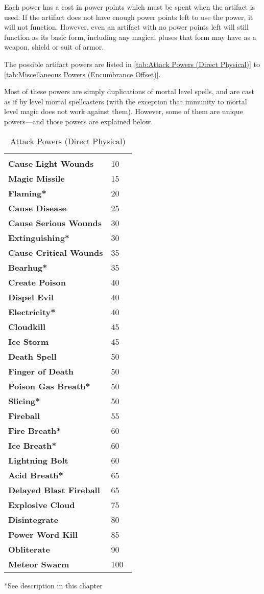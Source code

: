 \begin{multicols*}{2}
Each power has a cost in power points which must be spent when the artifact is used. If the artifact does not have enough power points left to use the power, it will not function. However, even an artifact with no power points left will still function as its basic form, including any magical pluses that form may have as a weapon, shield or suit of armor.

The possible artifact powers are listed in \autoref*{tab:Attack Powers (Direct Physical)} to \autoref*{tab:Miscellaneous Powers (Encumbrance Offset)}.

Most of these powers are simply duplications of mortal level spells, and are cast as if by  level mortal spellcasters (with the exception that  immunity to mortal level magic does not work against them). However, some of them are unique powers—and those powers are explained below.

\begin {table}[H]
  \caption{Attack Powers (Direct Physical)}\label{tab:Attack Powers (Direct Physical)}
  \begin{tabularx}{\columnwidth}{>{\bfseries}YY}
	 & \\
	Cause Light Wounds & 10\\
	Magic Missile & 15\\
	Flaming* & 20\\
	Cause Disease & 25\\
	Cause Serious Wounds & 30\\
	Extinguishing* & 30\\
	Cause Critical Wounds & 35\\
	Bearhug* & 35\\
	Create Poison & 40\\
	Dispel Evil & 40\\
	Electricity* & 40\\
	Cloudkill & 45\\
	Ice Storm & 45\\
	Death Spell & 50\\
	Finger of Death & 50\\
	Poison Gas Breath* & 50\\
	Slicing* & 50\\
	Fireball & 55\\
	Fire Breath* & 60\\
	Ice Breath* & 60\\
	Lightning Bolt & 60\\
	Acid Breath* & 65\\
	Delayed Blast Fireball & 65\\
	Explosive Cloud & 75\\
	Disintegrate & 80\\
	Power Word Kill & 85\\
	Obliterate & 90\\
	Meteor Swarm & 100\
  \end {tabularx}
	*See description in this chapter
\end {table}


\end{multicols*}
